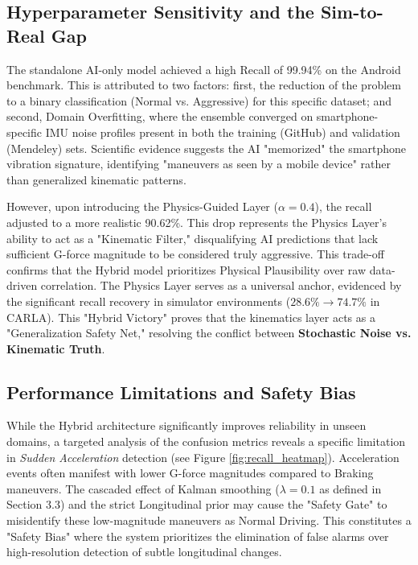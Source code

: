 \documentclass[pdflatex,sn-mathphys-num]{sn-jnl}
\theoremstyle{thmstyleone}
\theoremstyle{thmstyletwo}
\theoremstyle{thmstylethree}
\begin{document}
\subsection{Hyperparameter Sensitivity and the Sim-to-Real Gap}
The standalone AI-only model achieved a high Recall of 99.94\% on the Android benchmark. This is attributed to two factors: first, the reduction of the problem to a binary classification (Normal vs. Aggressive) for this specific dataset; and second, Domain Overfitting, where the ensemble converged on smartphone-specific IMU noise profiles present in both the training (GitHub) and validation (Mendeley) sets. Scientific evidence suggests the AI "memorized" the smartphone vibration signature, identifying "maneuvers as seen by a mobile device" rather than generalized kinematic patterns.

However, upon introducing the Physics-Guided Layer ($\alpha=0.4$), the recall adjusted to a more realistic 90.62\%. This drop represents the Physics Layer's ability to act as a "Kinematic Filter," disqualifying AI predictions that lack sufficient G-force magnitude to be considered truly aggressive. This trade-off confirms that the Hybrid model prioritizes Physical Plausibility over raw data-driven correlation. The Physics Layer serves as a universal anchor, evidenced by the significant recall recovery in simulator environments ($28.6\% \to 74.7\%$ in CARLA). This "Hybrid Victory" proves that the kinematics layer acts as a "Generalization Safety Net," resolving the conflict between \textbf{Stochastic Noise vs. Kinematic Truth}.

\subsection{Performance Limitations and Safety Bias}
While the Hybrid architecture significantly improves reliability in unseen domains, a targeted analysis of the confusion metrics reveals a specific limitation in \textit{Sudden Acceleration} detection (see Figure \ref{fig:recall_heatmap}). Acceleration events often manifest with lower G-force magnitudes compared to Braking maneuvers. The cascaded effect of Kalman smoothing ($\lambda=0.1$ as defined in Section 3.3) and the strict Longitudinal prior may cause the "Safety Gate" to misidentify these low-magnitude maneuvers as Normal Driving. This constitutes a "Safety Bias" where the system prioritizes the elimination of false alarms over high-resolution detection of subtle longitudinal changes.
\end{document}
